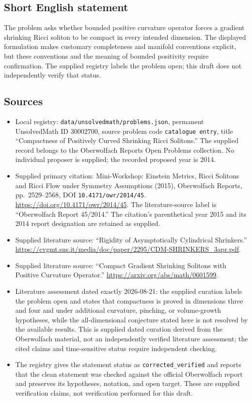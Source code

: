 \documentclass[11pt]{article}
\begin{document}
\subsection{Short English statement}
The problem asks whether bounded positive curvature operator forces a gradient shrinking Ricci soliton to be compact in every intended dimension. The displayed formulation makes customary completeness and manifold conventions explicit, but these conventions and the meaning of bounded positivity require confirmation. The supplied registry labels the problem open; this draft does not independently verify that status.
\subsection{Sources}
\begin{itemize}
\item Local registry: \texttt{data/unsolvedmath/problems.json}, permanent UnsolvedMath ID \(30002700\), source problem code \texttt{catalogue entry}, title ``Compactness of Positively Curved Shrinking Ricci Solitons.'' The supplied record belongs to the Oberwolfach Reports Open Problems collection. No individual proposer is supplied; the recorded proposed year is 2014.
\item Supplied primary citation: Mini-Workshop: Einstein Metrics, Ricci Solitons and Ricci Flow under Symmetry Assumptions (2015), Oberwolfach Reports, pp.\ 2529--2568, DOI \texttt{10.4171/owr/2014/45}. \url{https://doi.org/10.4171/owr/2014/45}. The literature-source label is ``Oberwolfach Report 45/2014.'' The citation's parenthetical year 2015 and its 2014 report designation are retained as supplied.
\item Supplied literature source: ``Rigidity of Asymptotically Cylindrical Shrinkers.'' \url{https://cvgmt.sns.it/media/doc/paper/2295/CDM-SHRINKERS_3apr.pdf}.
\item Supplied literature source: ``Compact Gradient Shrinking Solitons with Positive Curvature Operator.'' \url{https://arxiv.org/abs/math/0601599}.
\item Literature assessment dated exactly 2026-08-21: the supplied curation labels the problem open and states that compactness is proved in dimensions three and four and under additional curvature, pinching, or volume-growth hypotheses, while the all-dimensional conjecture stated here is not resolved by the available results. This is supplied dated curation derived from the Oberwolfach material, not an independently verified literature assessment; the cited claims and time-sensitive status require independent checking.
\item The registry gives the statement status as \texttt{corrected\_verified} and reports that the clean statement was checked against the official Oberwolfach report and preserves its hypotheses, notation, and open target. These are supplied verification claims, not verification performed for this draft.
\end{itemize}
\end{document}
